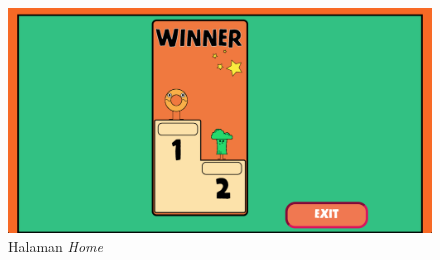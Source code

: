\begin{enumerate}
	\begin{figure}[H]
		\centering
		\includegraphics[scale=0.25]{Gambar/realWeb5_over}
		\caption{Halaman \textit{Home}}
		\label{fig:realWeb5_over}
	\end{figure}


\end{enumerate}
